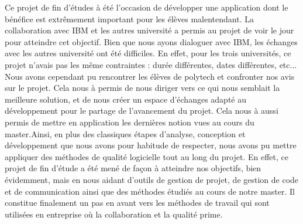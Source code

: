 \documentclass[a4paper,11pt]{report}
\begin{document}
Ce projet de fin d'études à été l'occasion de développer une application dont le bénéfice est extrêmement important pour les élèves malentendant. La collaboration avec IBM et les autres université a permis au projet de voir le jour pour atteindre cet objectif. Bien que nous ayons dialoguer avec IBM, les échanges avec les autres université ont été difficiles. En effet, pour les trois universités, ce projet n'avais pas les même contraintes : durée différentes, dates différentes, etc...
Nous avons cependant pu rencontrer les élèves de polytech et confronter nos avis sur le projet. Cela nous à permis de nous diriger vers ce qui nous semblait la meilleure solution, et de nous créer un espace d'échanges adapté au développement pour le partage de l'avancement du projet.
\medskip
Cela nous à aussi permis de mettre en application les dernières notion vues au cours du master.Ainsi, en plus des classiques étapes d'analyse, conception et développement que nous avons pour habitude de respecter, nous avons pu mettre appliquer des méthodes de qualité logicielle tout au long du projet. En effet, ce projet de fin d'étude a été mené de façon à atteindre nos objectifs, bien évidemment, mais en nous aidant d'outils de gestion de projet, de gestion de code et de communication ainsi que des méthodes étudiés au cours de notre master.
\medskip
Il constitue finalement un pas en avant vers les méthodes de travail qui sont utilisées en entreprise où la collaboration et la qualité prime.


\listoffigures   


\end{document}
